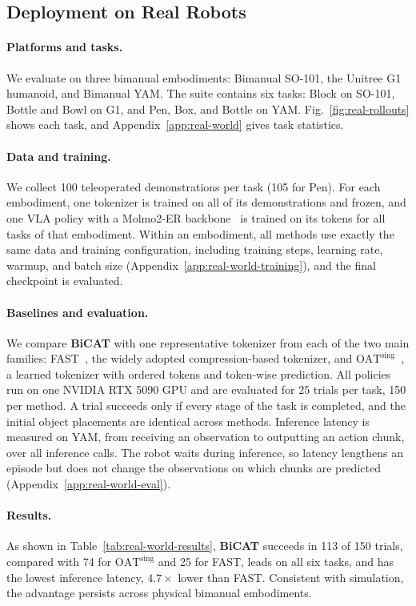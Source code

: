 \subsection{Deployment on Real Robots}
\label{sec:real-robot-deployment}

\paragraph{Platforms and tasks.}
We evaluate on three bimanual embodiments: Bimanual SO-101, the Unitree G1
humanoid, and Bimanual YAM. The suite contains six tasks: Block on SO-101,
Bottle and Bowl on G1, and Pen, Box, and Bottle on YAM.
Fig.~\ref{fig:real-rollouts} shows each task, and
Appendix~\ref{app:real-world} gives task statistics.

\paragraph{Data and training.}
We collect 100 teleoperated demonstrations per task (105 for Pen). For each
embodiment, one tokenizer is trained on all of its demonstrations and
frozen, and one VLA policy with a Molmo2-ER
backbone~\cite{fang2026molmoact2} is trained on its tokens for all tasks of
that embodiment. Within an embodiment, all methods use exactly the same
data and training configuration, including training steps, learning rate,
warmup, and batch size (Appendix~\ref{app:real-world-training}), and the
final checkpoint is evaluated.

\paragraph{Baselines and evaluation.}
We compare \textbf{BiCAT} with one representative tokenizer from each of the
two main families: FAST~\cite{pertsch2025fast}, the widely adopted
compression-based tokenizer, and $\mathrm{OAT}^{\mathrm{sing}}$~\cite{liu2026oat_rss},
a learned tokenizer with ordered tokens and token-wise prediction. All
policies run on one NVIDIA RTX 5090 GPU and are evaluated for 25 trials per
task, 150 per method. A trial succeeds only if every stage of the task is
completed, and the initial object placements are identical across methods.
Inference latency is measured on YAM, from receiving an observation to
outputting an action chunk, over all inference calls.
The robot waits during inference, so latency lengthens an episode but does
not change the observations on which chunks are predicted
(Appendix~\ref{app:real-world-eval}).

\paragraph{Results.}
As shown in Table~\ref{tab:real-world-results}, \textbf{BiCAT} succeeds in 113
of 150 trials, compared with 74 for $\mathrm{OAT}^{\mathrm{sing}}$ and 25 for
FAST, leads on all six tasks, and has the lowest inference latency, $4.7\times$
lower than FAST. Consistent with simulation, the advantage persists across physical bimanual embodiments.
